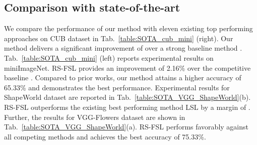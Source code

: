 \documentclass{bmvc2k}
\begin{document}
\subsection{Comparison with state-of-the-art}\label{sec:results}
\noindent We compare the performance of our method with eleven existing top performing approaches on CUB dataset in Tab.~\ref{table:SOTA_cub_mini} (right). Our method delivers a significant improvement of  over a strong baseline method \cite{chen2020new}.
Tab.~\ref{table:SOTA_cub_mini} (left) reports experimental results on miniImageNet. RS-FSL provides an improvement of 2.16\% over the competitive baseline \cite{chen2020new}. Compared to prior works, our method attains a higher accuracy of 65.33\% and demonstrates the best performance. Experimental results for ShapeWorld dataset are reported in Tab.~\ref{table:SOTA_VGG_ShapeWorld}(b). RS-FSL outperforms the existing best performing method LSL \cite{mu2020shaping} by a margin of . Further, the results for VGG-Flowers dataset are shown in Tab.~\ref{table:SOTA_VGG_ShapeWorld}(a). RS-FSL performs favorably against all competing methods and achieves the best accuracy of 75.33\%.
\end{document}
